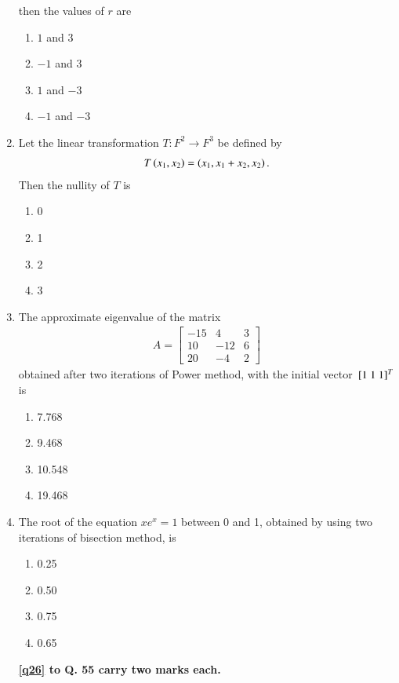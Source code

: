 \documentclass[journal]{IEEEtran}
\begin{document}
\begin{enumerate}
then the values of $r$ are
\begin{enumerate}
    \item $1$ and $3$
    \item $-1$ and $3$
    \item $1$ and $-3$
    \item $-1$ and $-3$
\end{enumerate}
\item Let the linear transformation $T : F^2 \rightarrow F^3$ be defined by
\begin{align}
T \left(x_1, x_2\right) = \left(x_1, x_1 + x_2, x_2\right).
\end{align}
Then the nullity of $T$ is

\begin{enumerate}
    \item 0
    \item 1
    \item 2
    \item 3
\end{enumerate}

\item The approximate eigenvalue of the matrix
\begin{align}
A = \begin{bmatrix}
-15 & 4 & 3 \\
10 & -12 & 6 \\
20 & -4 & 2 
\end{bmatrix}
\end{align}
obtained after two iterations of Power method, with the initial vector ${}\left[1 \ 1 \ 1\right]^T$ is

\begin{enumerate}
    \item 7.768
    \item 9.468
    \item 10.548
    \item 19.468
\end{enumerate}
\item The root of the equation $x e^x = 1$ between 0 and 1, obtained by using two iterations of bisection method, is
\begin{enumerate}
    \item 0.25
    \item 0.50
    \item 0.75
    \item 0.65
\end{enumerate}

\textbf{ \ref{q26} to Q. 55 carry two marks each.}


\end{enumerate}
\end{document}
